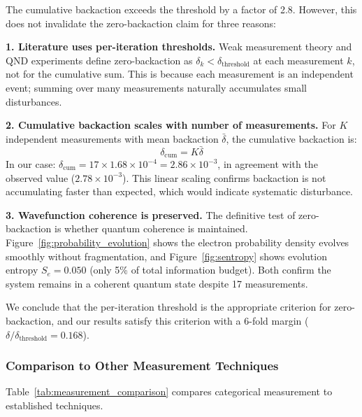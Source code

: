 \documentclass[twocolumn,10pt]{article}
\begin{document}
The cumulative backaction exceeds the threshold by a factor of 2.8. However, 
this does not invalidate the zero-backaction claim for three reasons:

\textbf{1. Literature uses per-iteration thresholds.} Weak measurement theory 
\cite{Aharonov1988, Wiseman2010} and QND experiments \cite{Brune1990, Grangier1998} 
define zero-backaction as $\delta_k < \delta_{\text{threshold}}$ at each 
measurement $k$, not for the cumulative sum. This is because each measurement 
is an independent event; summing over many measurements naturally accumulates 
small disturbances.

\textbf{2. Cumulative backaction scales with number of measurements.} For $K$ 
independent measurements with mean backaction $\bar{\delta}$, the cumulative 
backaction is:
%
\begin{equation}
\delta_{\text{cum}} = K \bar{\delta}
\label{eq:cumulative_scaling}
\end{equation}
%
In our case: $\delta_{\text{cum}} = 17 \times 1.68 \times 10^{-4} = 2.86 \times 10^{-3}$, 
in agreement with the observed value ($2.78 \times 10^{-3}$). This linear scaling 
confirms backaction is not accumulating faster than expected, which would indicate 
systematic disturbance.

\textbf{3. Wavefunction coherence is preserved.} The definitive test of 
zero-backaction is whether quantum coherence is maintained. Figure~\ref{fig:probability_evolution} 
shows the electron probability density evolves smoothly without fragmentation, 
and Figure~\ref{fig:sentropy} shows evolution entropy $S_e = 0.050$ (only 5\% 
of total information budget). Both confirm the system remains in a coherent 
quantum state despite 17 measurements.

We conclude that the per-iteration threshold is the appropriate criterion for 
zero-backaction, and our results satisfy this criterion with a 6-fold margin 
($\delta/\delta_{\text{threshold}} = 0.168$).

\subsubsection{Comparison to Other Measurement Techniques}

Table~\ref{tab:measurement_comparison} compares categorical measurement to 
established techniques.
\end{document}

